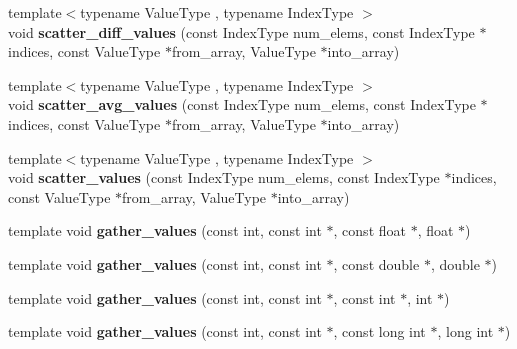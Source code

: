 \begin{DoxyCompactItemize}
\item 
\mbox{\label{namespaceschwz_adbc33f65188d6040744e0e022bc99d62}} 
{\footnotesize template$<$typename Value\+Type , typename Index\+Type $>$ }\\void {\bfseries scatter\+\_\+diff\+\_\+values} (const Index\+Type num\+\_\+elems, const Index\+Type $\ast$indices, const Value\+Type $\ast$from\+\_\+array, Value\+Type $\ast$into\+\_\+array)
\item 
\mbox{\label{namespaceschwz_a07d5a0ad6fe3b1c9692a933ccf402ab4}} 
{\footnotesize template$<$typename Value\+Type , typename Index\+Type $>$ }\\void {\bfseries scatter\+\_\+avg\+\_\+values} (const Index\+Type num\+\_\+elems, const Index\+Type $\ast$indices, const Value\+Type $\ast$from\+\_\+array, Value\+Type $\ast$into\+\_\+array)
\item 
\mbox{\label{namespaceschwz_a8e9cee5617c5c8270b831925ea4e6575}} 
{\footnotesize template$<$typename Value\+Type , typename Index\+Type $>$ }\\void {\bfseries scatter\+\_\+values} (const Index\+Type num\+\_\+elems, const Index\+Type $\ast$indices, const Value\+Type $\ast$from\+\_\+array, Value\+Type $\ast$into\+\_\+array)
\item 
\mbox{\label{namespaceschwz_a7ab38225d7d861d19a8832cfffb7efe5}} 
template void {\bfseries gather\+\_\+values} (const int, const int $\ast$, const float $\ast$, float $\ast$)
\item 
\mbox{\label{namespaceschwz_aa6c2935754fee8a672b1ead7a7ca0fe3}} 
template void {\bfseries gather\+\_\+values} (const int, const int $\ast$, const double $\ast$, double $\ast$)
\item 
\mbox{\label{namespaceschwz_a4bed0b908c287eb731936d0fcece6c6e}} 
template void {\bfseries gather\+\_\+values} (const int, const int $\ast$, const int $\ast$, int $\ast$)
\item 
\mbox{\label{namespaceschwz_aab13b4ded1cd7a8c5bd9e738035c36e6}} 
template void {\bfseries gather\+\_\+values} (const int, const int $\ast$, const long int $\ast$, long int $\ast$)
\item 

\end{DoxyCompactItemize}
